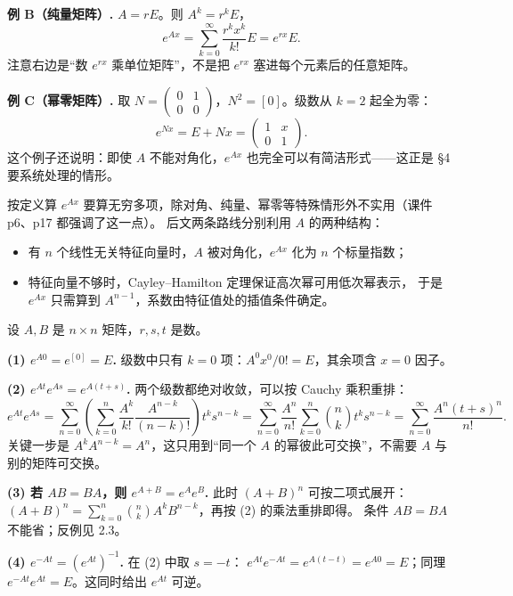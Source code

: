 \documentclass[11pt]{ctexart}
\newcommand{\pmat}[1]{\begin{pmatrix}#1\end{pmatrix}}
\newcommand{\zero}{[0]}
\begin{document}
\textbf{例 B（纯量矩阵）.} $A=rE$。则 $A^k=r^kE$，
\[
e^{Ax}=\sum_{k=0}^{\infty}\frac{r^kx^k}{k!}E=e^{rx}E .
\]
注意右边是“数 $e^{rx}$ 乘单位矩阵”，不是把 $e^{rx}$ 塞进每个元素后的任意矩阵。

\textbf{例 C（幂零矩阵）.} 取 $N=\pmat{0&1\\0&0}$，$N^2=\zero$。级数从 $k=2$ 起全为零：
\[
e^{Nx}=E+Nx=\pmat{1&x\\0&1}.
\]
这个例子还说明：即使 $A$ 不能对角化，$e^{Ax}$ 也完全可以有简洁形式——这正是 §4 要系统处理的情形。


按定义算 $e^{Ax}$ 要算无穷多项，除对角、纯量、幂零等特殊情形外不实用（课件 p6、p17 都强调了这一点）。
后文两条路线分别利用 $A$ 的两种结构：
\begin{itemize}
  \item 有 $n$ 个线性无关特征向量时，$A$ 被对角化，$e^{Ax}$ 化为 $n$ 个标量指数；
  \item 特征向量不够时，Cayley--Hamilton 定理保证高次幂可用低次幂表示，
        于是 $e^{Ax}$ 只需算到 $A^{n-1}$，系数由特征值处的插值条件确定。
\end{itemize}



设 $A,B$ 是 $n\times n$ 矩阵，$r,s,t$ 是数。

\textbf{(1) $e^{A0}=e^{\zero}=E$.} 级数中只有 $k=0$ 项：$A^0x^0/0!=E$，其余项含 $x=0$ 因子。

\textbf{(2) $e^{At}e^{As}=e^{A(t+s)}$.} 两个级数都绝对收敛，可以按 Cauchy 乘积重排：
\[
e^{At}e^{As}
=\sum_{n=0}^{\infty}\left(\sum_{k=0}^{n}\frac{A^k}{k!}\frac{A^{n-k}}{(n-k)!}\right)t^ks^{n-k}
=\sum_{n=0}^{\infty}\frac{A^n}{n!}\sum_{k=0}^{n}\binom{n}{k}t^ks^{n-k}
=\sum_{n=0}^{\infty}\frac{A^n(t+s)^n}{n!}.
\]
关键一步是 $A^kA^{n-k}=A^n$，这只用到“同一个 $A$ 的幂彼此可交换”，不需要 $A$ 与别的矩阵可交换。

\textbf{(3) 若 $AB=BA$，则 $e^{A+B}=e^Ae^B$.} 此时 $(A+B)^n$ 可按二项式展开：
$(A+B)^n=\sum_{k=0}^n\binom{n}{k}A^kB^{n-k}$，再按 (2) 的乘法重排即得。
条件 $AB=BA$ 不能省；反例见 2.3。

\textbf{(4) $e^{-At}=(e^{At})^{-1}$.} 在 (2) 中取 $s=-t$：
$e^{At}e^{-At}=e^{A(t-t)}=e^{A0}=E$；同理 $e^{-At}e^{At}=E$。这同时给出 $e^{At}$ 可逆。
\end{document}
